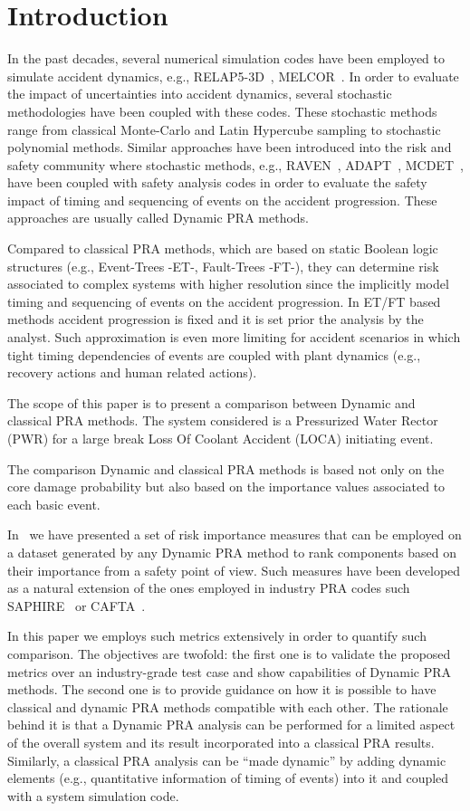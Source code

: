 \section{Introduction}
\label{sec:introduction}

In the past decades, several numerical simulation codes have been employed 
to simulate accident dynamics, e.g., RELAP5-3D~\cite{}, MELCOR~\cite{}. 
In order to evaluate the impact of uncertainties into accident dynamics, 
several stochastic methodologies have been coupled with these codes. 
These stochastic methods range from classical Monte-Carlo and Latin Hypercube 
sampling to stochastic polynomial methods. 
Similar approaches have been introduced into the risk and safety community 
where stochastic methods, e.g., RAVEN~\cite{}, ADAPT~\cite{}, MCDET~\cite{}, 
have been coupled with safety analysis codes in order to evaluate the safety 
impact of timing and sequencing of events on the accident progression. 
These approaches are usually called Dynamic PRA methods.   

Compared to classical PRA methods, which are
based on static Boolean logic structures (e.g., Event-Trees -ET-, Fault-Trees -FT-), 
they can determine risk associated to complex systems with higher resolution 
since the implicitly model timing and sequencing of events
on the accident progression. In ET/FT based methods accident progression is fixed
and it is set prior the analysis by the analyst.
Such approximation is even more limiting for accident scenarios in which tight timing 
dependencies of events are coupled with plant dynamics (e.g., recovery actions and human 
related actions).

The scope of this paper is to present a comparison between Dynamic and classical PRA
methods. The system considered is a Pressurized Water Rector (PWR) for a large break 
Loss Of Coolant Accident (LOCA) initiating event.

The comparison Dynamic and classical PRA
methods is based not only on the core damage probability but also
based on the importance values associated to each basic event.

In~\cite{} we have presented a set of risk importance 
measures that can be employed on a dataset generated by any Dynamic PRA method
to rank components based on their importance from a safety point of view.
Such measures have been developed as a natural extension of the ones employed
in industry PRA codes such SAPHIRE~\cite{} or CAFTA~\cite{}.

In this paper we employs such metrics extensively in order to quantify such comparison. 
The objectives are twofold: the first one is to validate the proposed metrics over 
an industry-grade test case and show capabilities of Dynamic PRA methods. 
The second one is to provide guidance on how it is possible to have classical and dynamic
PRA methods compatible with each other. The rationale behind it is that a Dynamic PRA
analysis can be performed for a limited aspect of the overall system and its result 
incorporated into a classical PRA results. Similarly, a classical PRA analysis can be 
``made dynamic'' by adding dynamic elements (e.g., quantitative information of timing 
of events) into it and coupled with a system simulation code.